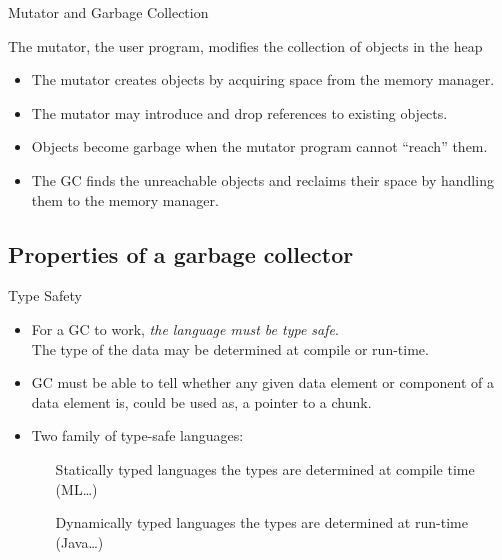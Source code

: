 \begin{bibunit}[apalike]
\begin{frame}{Mutator and Garbage Collection}
	\begin{definition}[Mutator]
		The mutator, the user program, modifies the collection of objects in the heap
	\end{definition}
	\vfill
	\begin{itemize}
	\item The mutator creates objects by acquiring space from the memory manager.
	\item The mutator may introduce and drop references to existing objects.
	\item Objects become garbage when the mutator program cannot ``reach'' them.
	\item The GC finds the unreachable objects and reclaims their space by handling them to the memory manager.
	\end{itemize}
\end{frame}

\subsection{Properties of a garbage collector}

\tableofcontentslide[sections={2-6},sectionstyle={show/shaded},subsectionstyle={show/shaded/hide},subsubsectionstyle={hide/hide/hide/hide}]

\begin{frame}{Type Safety}
	\begin{itemize}
	\item For a GC to work, \emph{the language must be type safe}. \\[.5em]
		The type of the data may be determined at compile or run-time.
	\vfill
	\item GC must be able to tell whether any given data element or component of a data element is, could be used as, a pointer to a chunk.
	\vfill
	\item Two family of type-safe languages:
		\begin{enumerate}
		\item[Statically typed languages] the types are determined at compile time (ML\dots)
		\item[Dynamically typed languages] the types are determined at run-time (Java\dots)
		\end{enumerate}
	\end{itemize}
\end{frame}


\end{bibunit}
